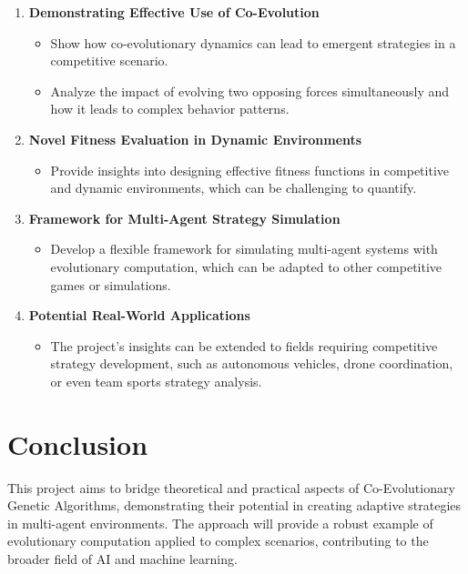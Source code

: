 \documentclass[12pt,letterpaper]{article}
\begin{document}
\begin{enumerate}
    \item \textbf{Demonstrating Effective Use of Co-Evolution}
    \begin{itemize}
        \item Show how co-evolutionary dynamics can lead to emergent strategies in a competitive scenario.
        \item Analyze the impact of evolving two opposing forces simultaneously and how it leads to complex behavior patterns.
    \end{itemize}
    \item \textbf{Novel Fitness Evaluation in Dynamic Environments}
    \begin{itemize}
        \item Provide insights into designing effective fitness functions in competitive and dynamic environments, which can be challenging to quantify.
    \end{itemize}
    \item \textbf{Framework for Multi-Agent Strategy Simulation}
    \begin{itemize}
        \item Develop a flexible framework for simulating multi-agent systems with evolutionary computation, which can be adapted to other competitive games or simulations.
    \end{itemize}
    \item \textbf{Potential Real-World Applications}
    \begin{itemize}
        \item The project’s insights can be extended to fields requiring competitive strategy development, such as autonomous vehicles, drone coordination, or even team sports strategy analysis.
    \end{itemize}
\end{enumerate}

\section{Conclusion}
This project aims to bridge theoretical and practical aspects of Co-Evolutionary Genetic Algorithms, demonstrating their potential in creating adaptive strategies in multi-agent environments. The approach will provide a robust example of evolutionary computation applied to complex scenarios, contributing to the broader field of AI and machine learning.
\end{document}
